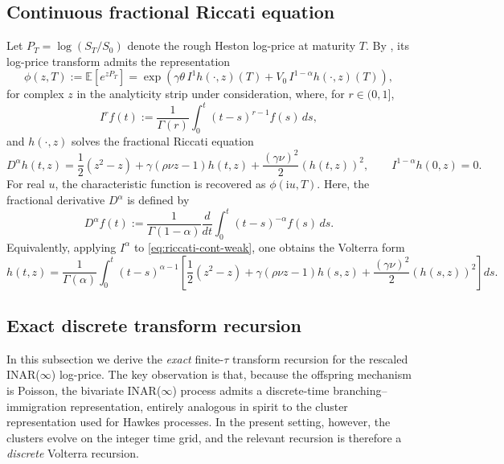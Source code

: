 \documentclass[letterpaper]{article}
\numberwithin{equation}{section}
\theoremstyle{definition}
\theoremstyle{remark}
\newcommand{\E}{\mathbb{E}}
\newcommand{\ii}{\mathrm{i}}
\begin{document}

\subsection{Continuous fractional Riccati equation}

Let $P_T=\log(S_T/S_0)$ denote the rough Heston log-price at maturity $T$.
By \cite{el2019characteristic}, its log-price transform admits the representation
\begin{equation}\label{eq:phi-cont-weak}
\phi(z,T):=\E\!\left[e^{zP_T}\right]
  =\exp\!\left(\gamma\theta\, I^1 h(\cdot,z)(T)+V_0\, I^{1-\alpha}h(\cdot,z)(T)\right),
\end{equation}
for complex $z$ in the analyticity strip under consideration, where, for $r\in(0,1]$,
\[
  I^r f(t):=\frac{1}{\Gamma(r)}\int_0^t (t-s)^{r-1}f(s)\,ds,
\]
and $h(\cdot,z)$ solves the fractional Riccati equation
\begin{equation}\label{eq:riccati-cont-weak}
  D^\alpha h(t,z)
  =\frac12(z^2-z)+\gamma(\rho\nu z-1)h(t,z)
   +\frac{(\gamma\nu)^2}{2}\left(h(t,z)\right)^2,
  \qquad I^{1-\alpha}h(0,z)=0.
\end{equation}
For real $u$, the characteristic function is recovered as $\phi(\ii u,T)$.
Here, the fractional derivative $D^\alpha$ is defined by
\[
  D^\alpha f(t)
  :=\frac{1}{\Gamma(1-\alpha)}
    \frac{d}{dt}\int_0^t (t-s)^{-\alpha}f(s)\,ds.
\]
Equivalently, applying $I^\alpha$ to \eqref{eq:riccati-cont-weak}, one obtains the Volterra form
\begin{equation}\label{eq:riccati-volterra-weak}
  h(t,z)
  =\frac{1}{\Gamma(\alpha)}\int_0^t
    (t-s)^{\alpha-1}
    \left[
      \frac12(z^2-z)
      +\gamma(\rho\nu z-1)h(s,z)
      +\frac{(\gamma\nu)^2}{2}\left(h(s,z)\right)^2
    \right]ds.
\end{equation}


\subsection{Exact discrete transform recursion}\label{subsec:exact-discrete-transform}

In this subsection we derive the \emph{exact} finite-$\tau$ transform recursion for the rescaled INAR($\infty$) log-price. The key observation is that, because the offspring mechanism is Poisson, the bivariate INAR($\infty$) process admits a discrete-time branching--immigration representation, entirely analogous in spirit to the cluster representation used for Hawkes processes. In the present setting, however, the clusters evolve on the integer time grid, and the relevant recursion is therefore a \emph{discrete} Volterra recursion.
\end{document}
